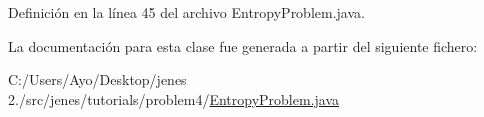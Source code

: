 Definición en la línea 45 del archivo Entropy\-Problem.\-java.



La documentación para esta clase fue generada a partir del siguiente fichero\-:\begin{DoxyCompactItemize}
\item 
C\-:/\-Users/\-Ayo/\-Desktop/jenes 2./src/jenes/tutorials/problem4/\hyperlink{problem4_2_entropy_problem_8java}{Entropy\-Problem.\-java}\end{DoxyCompactItemize}
